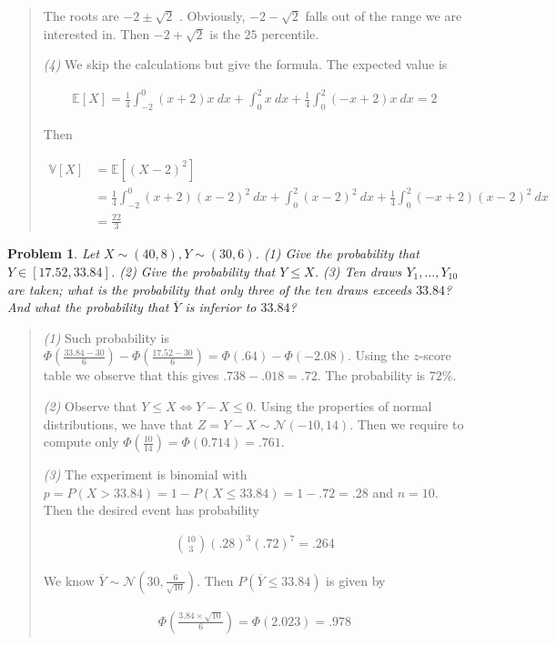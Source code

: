 \documentclass[a4paper, 12pt]{article}
\newtheorem{problem}{Problem}
\newtheorem{problem}{Problem}
\begin{document}
\begin{quote}
The roots are $-2 \pm \sqrt{2}$ . Obviously, $-2 - \sqrt{2} $ falls out of the
range we are interested in. Then $-2 + \sqrt{2} $ is the $25$ percentile.

\textit{(4)} We skip the calculations but give the formula. The expected value
is 

\begin{align*}
    \mathbb{E}\left[ X \right]  = \frac{1}{4} \int_{-2}^{0} (x+2)x~dx +
    \int_{0}^{2}x~dx + \frac{1}{4}\int_0^{2}(-x + 2)x ~dx = 2
\end{align*}

Then

\begin{align*}
    \mathbb{V}\left[ X \right] &= \mathbb{E}\left[ (X - 2)^2 \right]  \\ 
                               &= \frac{1}{4} \int_{-2}^{0} (x+2)(x-2)^2~dx +
    \int_{0}^{2}(x-2)^2~dx + \frac{1}{4}\int_0^{2}(-x + 2)(x-2)^2 ~dx \\&=
    \frac{22}{3}
\end{align*}

\end{quote}
\normalsize

\pagebreak 

\begin{problem}
    Let $X \sim (40, 8), Y \sim (30, 6)$. \textit{(1)} Give the
    probability that $Y \in [17.52, 33.84]$. \textit{(2)} Give the probability
    that $Y \leq X$. \textit{(3)} Ten draws $Y_1, \ldots, Y_{10}$ are taken;
    what is the probability that only three of the ten draws exceeds $33.84$?
    And what the probability that $\overline{Y}$ is inferior to $33.84$?
\end{problem}



\small
\begin{quote}

\textit{(1)} Such probability is $\Phi( \frac{33.84 - 30}{6} ) - 
\Phi( \frac{17.52 -30 }{6} ) = \Phi(.64) - \Phi(-2.08)$. Using the $z$-score
table we observe that this gives $.738 - .018 = .72$. The probability is $72\%$.

\textit{(2)} Observe that $Y \leq X \iff Y - X \leq 0$. Using the properties of
normal distributions, we have that $Z = Y - X \sim \mathcal{N}(-10,  14)$. Then
we require to compute only $\Phi( \frac{10}{14} ) = \Phi(0.714) = .761$.

\textit{(3)} The experiment is binomial with $p = P(X > 33.84) = 1 - P(X \leq
33.84) = 1 - .72 = .28$ and $n = 10$. Then the desired event has probability

\begin{align*}
    \binom{10}{3}(.28)^{3}(.72)^{7}= .264
\end{align*}

We know $\overline{Y} \sim \mathcal{N}(30, \frac{6}{\sqrt{10} })$. Then
$P(\overline{Y} \leq 33.84)$ is given by 

\begin{align*}
    \Phi(\frac{3.84 \times \sqrt{10} }{6}) = \Phi(2.023) = .978
\end{align*}

\end{quote}
\normalsize
\end{document}
